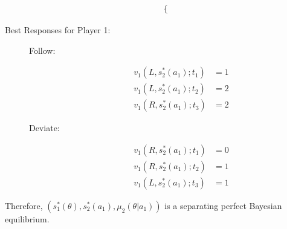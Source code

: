 \documentclass[10pt]{extarticle}
\begin{document}
\begin{description}
\begin{align*}
\begin{cases}
          \end{cases}
        \end{align*}
      \item[Best Responses for Player 1:]\hfill
        \begin{description}
          \item[Follow:]
            \begin{align*}
              v_1(L,s_2^{\ast}(a_1);t_1) &= 1\\
              v_1(L,s_2^{\ast}(a_1);t_2) &= 2\\
              v_1(R,s_2^{\ast}(a_1);t_3) &= 2
            \end{align*}
          \item[Deviate:]
            \begin{align*}
              v_1(R,s_2^{\ast}(a_1);t_1) &= 0\\
              v_1(R,s_2^{\ast}(a_1);t_2) &= 1\\
              v_1(L,s_2^{\ast}(a_1);t_3) &= 1
            \end{align*}
        \end{description}
    \end{description}
    Therefore, $(s_1^{\ast}(\theta),s_2^{\ast}(a_1),\mu_2(\theta|a_1))$ is a separating perfect Bayesian equilibrium.
    \pagebreak
\end{document}
